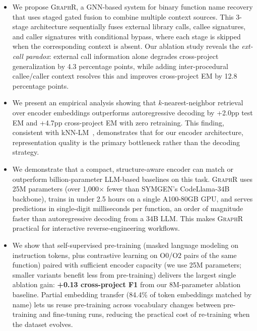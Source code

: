 \documentclass[sigconf,nonacm]{acmart}
\newcommand{\sysname}{\textsc{GraphR}}
\begin{document}
\begin{itemize}
    \item We propose \sysname{}, a GNN-based system for binary function name recovery that uses staged gated fusion to combine multiple context sources. This 3-stage architecture sequentially fuses external library calls, callee signatures, and caller signatures with conditional bypass, where each stage is skipped when the corresponding context is absent. Our ablation study reveals the \emph{ext-call paradox}: external call information alone degrades cross-project generalization by 4.3 percentage points, while adding inter-procedural callee/caller context resolves this and improves cross-project EM by 12.8 percentage points.

    \item We present an empirical analysis showing that $k$-nearest-neighbor retrieval over encoder embeddings outperforms autoregressive decoding by +2.0pp test EM and +4.7pp cross-project EM with zero retraining. This finding, consistent with kNN-LM~\cite{knnlm}, demonstrates that for our encoder architecture, representation quality is the primary bottleneck rather than the decoding strategy.

    \item We demonstrate that a compact, structure-aware encoder can match or outperform billion-parameter LLM-based baselines on this task. \sysname{} uses 25M parameters (over 1{,}000$\times$ fewer than SYMGEN's CodeLlama-34B backbone), trains in under 2.5 hours on a single A100-80GB GPU, and serves predictions in single-digit milliseconds per function, an order of magnitude faster than autoregressive decoding from a 34B LLM. This makes \sysname{} practical for interactive reverse-engineering workflows.

    \item We show that self-supervised pre-training (masked language modeling on instruction tokens, plus contrastive learning on O0/O2 pairs of the same function) paired with sufficient encoder capacity (we use 25M parameters; smaller variants benefit less from pre-training) delivers the largest single ablation gain: \textbf{+0.13 cross-project F1} from our 8M-parameter ablation baseline. Partial embedding transfer (84.4\% of token embeddings matched by name) lets us reuse pre-training across vocabulary changes between pre-training and fine-tuning runs, reducing the practical cost of re-training when the dataset evolves.


\end{itemize}
\end{document}
